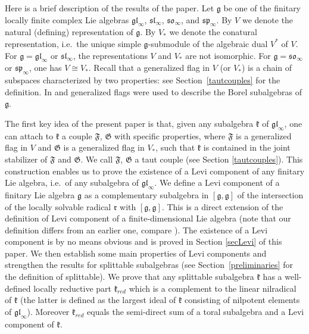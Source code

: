 \documentclass{article}
\def\gl{\mathfrak {gl}}
\def\g{\mathfrak {g}}
\def\sl{\mathfrak{sl}}
\def\so{\mathfrak{so}}
\def\sp{\mathfrak{sp}}
\def\k{\mathfrak{k}}
\def\r{\mathfrak{r}}
\def\F{\mathfrak{F}}
\def\G{\mathfrak{G}}
\begin{document}
Here is a brief description of the results of the paper. Let $\g$ be one of the finitary locally finite complex Lie algebras $\gl_\infty$, $\sl_\infty$, $\so_\infty$, and $\sp_\infty$.  By $V$ we denote the natural (defining) representation of $\g$.  By $V_*$ we denote the conatural representation, i.e.\ the unique simple $\g$-submodule of the algebraic dual $V^*$ of $V$.  For $\g = \gl_\infty$ or $\sl_\infty$, the representations $V$ and $V_*$ are not isomorphic.  For $\g = \so_\infty$ or $\sp_\infty$, one has $V \cong V_*$.  Recall that a generalized flag in $V$ (or $V_*$) is a chain of subspaces characterized by two properties: see Section~\ref{tautcouples} for the definition.  In \cite{DP2} and \cite{D} generalized flags were used to describe the Borel subalgebras of $\g$.

The first key idea of the present paper is that, given any subalgebra $\k$ of $\gl_\infty$, one can attach to $\k$ a couple $\F$, $\G$ with specific properties, where $\F$ is a generalized flag in $V$ and $\G$ is a generalized flag in $V_*$, such that $\k$ is contained in the joint stabilizer of $\F$ and $\G$.  We call $\F$, $\G$ a taut couple (see Section \ref{tautcouples}).  This construction enables us to prove the existence of a Levi component of any finitary Lie algebra, i.e.\ of any subalgebra of $\gl_\infty$. We define a Levi component of a finitary Lie algebra $\g$ as a complementary subalgebra in $[\g, \g]$ of the intersection of the locally solvable radical $\r$ with $[\g, \g]$. This is a direct extension of the definition of Levi component of a finite-dimensional Lie algebra (note that our definition differs from an earlier one, compare \cite{Ba}). The existence of a Levi component is by no means obvious and is proved in Section \ref{secLevi} of this paper. We then establish some main properties of Levi components and strengthen the results for splittable subalgebras (see Section~\ref{preliminaries} for the definition of splittable).  We prove that any splittable subalgebra $\k$ has a well-defined locally reductive part $\k_{red}$ which is a complement to the linear nilradical of $\k$ (the latter is defined as the largest ideal of $\k$ consisting of nilpotent elements of $\gl_\infty$). Moreover $\k_{red}$ equals the semi-direct sum of a toral subalgebra and a Levi component of $\k$. 
\end{document}
